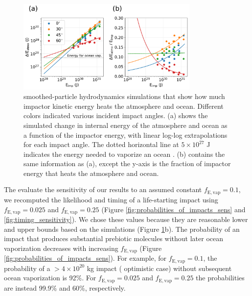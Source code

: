 \documentclass{aastex631}
\begin{document}
\begin{figure}
  \centering
  \includegraphics[width=0.8\textwidth]{figures/energy_for_ocean_vap.pdf}
  \caption{\citet{Citron_2022} smoothed-particle hydrodynamics simulations that show how much impactor kinetic energy heats the atmosphere and ocean. Different colors indicated various incident impact angles. (a) shows the simulated change in internal energy of the atmosphere and ocean as a function of the impactor energy, with linear log-log extrapolations for each impact angle. The dotted horizontal line at $5 \times 10^{27}$ J indicates the energy needed to vaporize an ocean \citep{Sleep_1989}. (b) contains the same information as (a), except the y-axis is the fraction of impactor energy that heats the atmosphere and ocean.}
  \label{fig:energy_for_ocean_vap}
\end{figure}

The evaluate the sensitivity of our results to an assumed constant $f_\mathrm{E,vap} = 0.1$, we recomputed the likelihood and timing of a life-starting impact using $f_\mathrm{E,vap} = 0.025$ and $f_\mathrm{E,vap} = 0.25$ (Figure \ref{fig:probabilities_of_impacts_sens} and \ref{fig:timing_sensitivity}). We chose these values because they are reasonable lower and upper bounds based on the \citet{Citron_2022} simulations (Figure \ref{fig:energy_for_ocean_vap}b). The probability of an impact that produces substantial prebiotic molecules without later ocean vaporization decreases with increasing $f_\mathrm{E,vap}$ (Figure \ref{fig:probabilities_of_impacts_sens}). For example, for $f_\mathrm{E,vap} = 0.1$, the probability of a $>4 \times 10^{20}$ kg impact (\citet{Wogan_2023} optimistic case) without subsequent ocean vaporization is 92\%. For $f_\mathrm{E,vap} = 0.025$ and $f_\mathrm{E,vap} = 0.25$ the probabilities are instead 99.9\% and 60\%, respectively.
\end{document}
